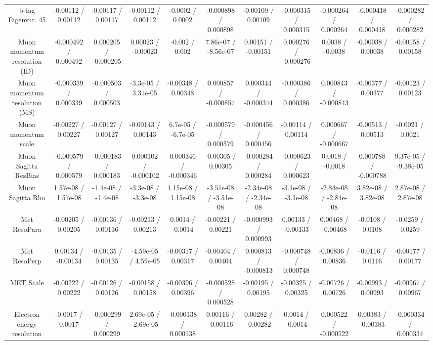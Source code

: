 \begin{table}[htbp]
\begin{center}
\begin{tabular}{|c|c|c|c|c|c|c|c|c|c|c|}
  b-tag Eigenvar. 45 & -0.00112 / 0.00112 & -0.00117 / 0.00117 & -0.00112 / 0.00112 & -0.0002 / 0.0002 & -0.000898 / 0.000898 & -0.00109 / 0.00109 & -0.000315 / 0.000315 & -0.000264 / 0.000264 & -0.000418 / 0.000418 & -0.000282 / 0.000282 \\ 
  Muon momentum resolution (ID) & -0.000492 / 0.000492 & 0.000205 / -0.000205 & 0.00023 / -0.00023 & -0.002 / 0.002 & 7.86e-07 / -8.56e-07 & 0.00151 / -0.00151 & 0.000276 / -0.000276 & 0.0038 / -0.0038 & -0.00038 / 0.00038 & -0.00158 / 0.00158 \\ 
  Muon momentum resolution (MS) & -0.000339 / 0.000339 & -0.000503 / 0.000503 & -3.3e-05 / 3.31e-05 & -0.00348 / 0.00348 & 0.000857 / -0.000857 & 0.000344 / -0.000344 & -0.000386 / 0.000386 & 0.000843 / -0.000843 & -0.00377 / 0.00377 & -0.00123 / 0.00123 \\ 
  Muon momentum scale & -0.00227 / 0.00227 & -0.00127 / 0.00127 & -0.00143 / 0.00143 & 6.7e-05 / -6.7e-05 & -0.000579 / 0.000579 & -0.000456 / 0.000456 & -0.00114 / 0.00114 & 0.000667 / -0.000667 & -0.00513 / 0.00513 & -0.0021 / 0.0021 \\ 
  Muon Sagitta ResBias & -0.000579 / 0.000579 & -0.000183 / 0.000183 & 0.000102 / -0.000102 & 0.000346 / -0.000346 & -0.00305 / 0.00305 & -0.000284 / 0.000284 & -0.000623 / 0.000623 & 0.0018 / -0.0018 & 0.000788 / -0.000788 & 9.37e-05 / -9.38e-05 \\ 
  Muon Sagitta Rho & 1.57e-08 / 1.57e-08 & -1.4e-08 / -1.4e-08 & -3.3e-08 / -3.3e-08 & 1.15e-08 / 1.15e-08 & -3.51e-08 / -3.51e-08 & -2.34e-08 / -2.34e-08 & -3.1e-08 / -3.1e-08 & -2.84e-08 / -2.84e-08 & 3.82e-08 / 3.82e-08 & 2.87e-08 / 2.87e-08 \\ 
  Met ResoPara & -0.00205 / 0.00205 & -0.00136 / 0.00136 & -0.00213 / 0.00213 & 0.0014 / -0.0014 & -0.00221 / 0.00221 & -0.000993 / 0.000993 & 0.00133 / -0.00133 & 0.00468 / -0.00468 & -0.0108 / 0.0108 & -0.0259 / 0.0259 \\ 
  Met ResoPerp & 0.00134 / -0.00134 & -0.00135 / 0.00135 & -4.59e-05 / 4.59e-05 & -0.00317 / 0.00317 & -0.00404 / 0.00404 & 0.000813 / -0.000813 & -0.000748 / 0.000748 & -0.00836 / 0.00836 & -0.0116 / 0.0116 & -0.00177 / 0.00177 \\ 
  MET Scale & -0.00222 / 0.00222 & -0.00126 / 0.00126 & -0.00158 / 0.00158 & -0.00396 / 0.00396 & -0.000528 / 0.000528 & -0.00195 / 0.00195 & -0.00325 / 0.00325 & -0.00726 / 0.00726 & -0.00993 / 0.00993 & -0.00967 / 0.00967 \\ 
  Electron energy resolution & -0.0017 / 0.0017 & -0.000299 / 0.000299 & 2.69e-05 / -2.69e-05 & -0.000138 / 0.000138 & 0.00116 / -0.00116 & 0.00282 / -0.00282 & 0.0014 / -0.0014 & 0.000522 / -0.000522 & 0.00383 / -0.00383 & -0.000334 / 0.000334 \\ 

\end{tabular}
\end{center}
\end{table}
